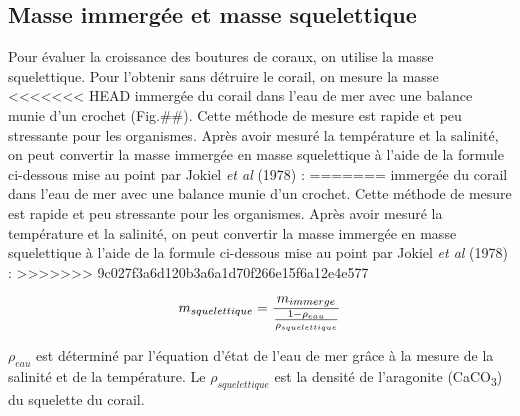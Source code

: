 \documentclass[]{report}
\begin{document}
\subsection{Masse immergée et masse
squelettique}\label{masse-immergee-et-masse-squelettique}

Pour évaluer la croissance des boutures de coraux, on utilise la masse
squelettique. Pour l'obtenir sans détruire le corail, on mesure la masse
<<<<<<< HEAD
immergée du corail dans l'eau de mer avec une balance munie d'un crochet
(Fig.\#\#). Cette méthode de mesure est rapide et peu stressante pour
les organismes. Après avoir mesuré la température et la salinité, on
peut convertir la masse immergée en masse squelettique à l'aide de la
formule ci-dessous mise au point par Jokiel \emph{et al} (1978) :
=======
immergée du corail dans l'eau de mer avec une balance munie d'un
crochet. Cette méthode de mesure est rapide et peu stressante pour les
organismes. Après avoir mesuré la température et la salinité, on peut
convertir la masse immergée en masse squelettique à l'aide de la formule
ci-dessous mise au point par Jokiel \emph{et al} (1978) :
>>>>>>> 9c027f3a6d120b3a6a1d70f266e15f6a12e4e577

\begin{equation}
\large
  m_{squelettique} = \frac {m_{immerge}}{ \frac{1 - \rho_{eau}}{ \rho_{squelettique}}}
\end{equation}

\(\rho_{eau}\) est déterminé par l'équation d'état de l'eau de mer grâce
à la mesure de la salinité et de la température. Le
\(\rho_{squelettique}\) est la densité de l'aragonite
(CaCO\textsubscript{3}) du squelette du corail.
\end{document}
